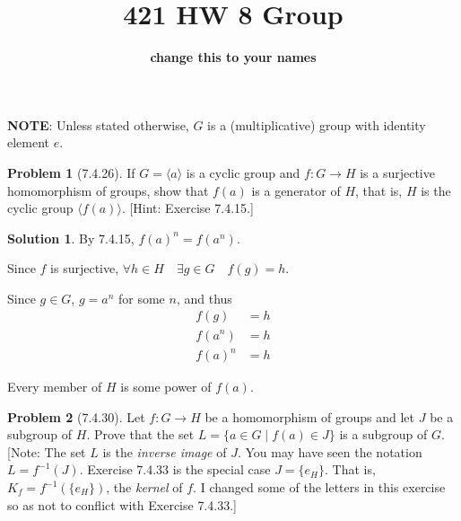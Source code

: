 \documentclass[12pt]{article}
\theoremstyle{definition}
\newtheorem*{prob}{Problem}
\newtheorem*{soln}{Solution}
\begin{document}
%
\title{421 HW 8 Group}
\author{\textbf{change this to your names}}

\date{}

\maketitle

\textbf{NOTE}: Unless stated otherwise, $G$ is a (multiplicative) 
group with identity element $e$.

\begin{prob}[7.4.26]
If  $G = \langle a\rangle$ is a cyclic group and $f:G \to H$ is a surjective 
homomorphism of  groups, show that $f(a)$ is a generator of $H$, 
that is, $H$ is the cyclic group $\langle f(a)\rangle$. [Hint: Exercise 7.4.15.]
\end{prob}

\begin{soln}

By 7.4.15, $f(a)^n=f(a^n)$.

Since $f$ is surjective, $\forall h\in H\quad \exists g\in G\quad f(g)=h$.

Since $g\in G$, $g=a^n$ for some $n$, and thus
\begin{align*}
f(g)&=h\\
f(a^n)&=h\\
f(a)^n&=h
\end{align*}

Every member of $H$ is some power of $f(a)$.

\end{soln}

%
%


\begin{prob}[7.4.30]
Let $f:G \to H$ be a homomorphism of groups and let $J$ be a subgroup of $H$. 
Prove that the set $L=\{a\in G \mid f(a)\in J\}$ is a subgroup of $G$.
[Note: The set $L$ is the \emph{inverse image} of $J$. You may have seen the
notation $L=f^{-1}(J)$. Exercise 7.4.33 is the special case $J = \{ e_H \}$.
That is, $K_f = f^{-1}(\{ e_H \})$, the \emph{kernel} of $f$. 
I changed some of the letters in this
exercise so as not to conflict with Exercise 7.4.33.]
\end{prob}
\end{document}
